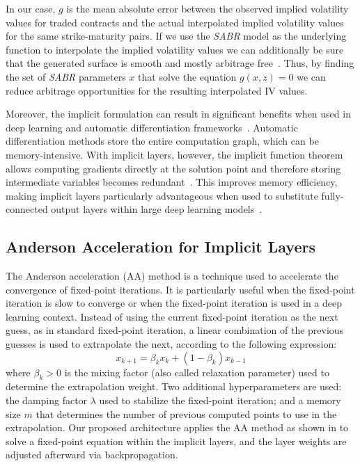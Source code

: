 In our case, $g$ is the mean absolute error between the observed implied volatility values for traded contracts
and the actual interpolated implied volatility values for the same strike-maturity pairs.
If we use the \textit{SABR} model as the underlying function to interpolate the implied volatility values
we can additionally be sure that the generated surface is smooth and mostly arbitrage free~\citep{Hagan2002, Grzelak2016, Hagan2014}.
Thus, by finding the set of \textit{SABR} parameters $x$ that solve the equation $g(x, z) = 0$
we can reduce arbitrage opportunities for the resulting interpolated IV values.

Moreover, the implicit formulation can result in significant benefits when used in
deep learning and automatic differentiation frameworks~\citep{Massaroli2021,Kolter2020}.
Automatic differentiation methods store the entire computation graph, which can be memory-intensive.
With implicit layers, however, the implicit function theorem allows computing gradients directly at the solution point and
therefore storing intermediate variables becomes redundant~\citep{Massaroli2021}.
This improves memory efficiency, making implicit layers particularly
advantageous when used to substitute fully-connected output layers within large deep learning models~\citep{Li2020}.

\subsection{Anderson Acceleration for Implicit Layers}
\label{subsec:anderson}

The Anderson acceleration (AA) method is a technique used to accelerate the convergence of fixed-point iterations.
It is particularly useful when the fixed-point iteration is slow to converge or when the fixed-point iteration is used in a deep learning context.
Instead of using the current fixed-point iteration as the next guess, as in standard fixed-point iteration,
a linear combination of the previous guesses is used to extrapolate the next, according to the following expression:
\[
    x_{k+1} = \beta_{k} x_{k} + (1 - \beta_{k}) x_{k-1}
\]
where $\beta_{k} > 0$ is the mixing factor (also called relaxation parameter) used to determine the extrapolation weight.
Two additional hyperparameters are used: the damping factor $\lambda$ used to stabilize the fixed-point iteration;
and a memory size $m$ that determines the number of previous computed points to use in the extrapolation.
Our proposed architecture applies the AA method as shown in 
to solve a fixed-point equation within the implicit layers, and the layer weights are adjusted afterward via backpropagation.

